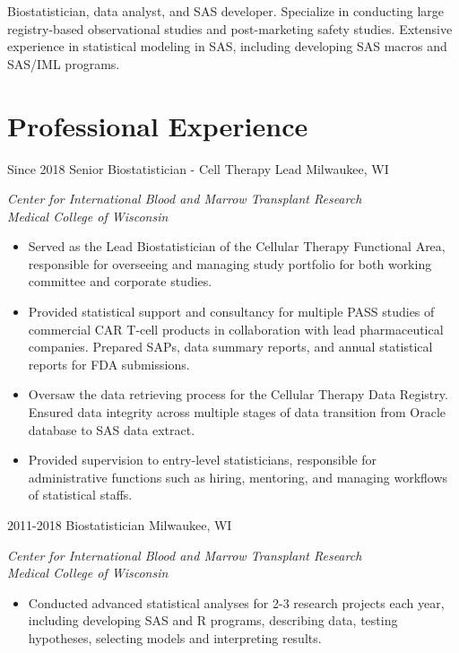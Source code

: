Biostatistician, data analyst, and SAS developer. Specialize in conducting large registry-based observational studies and post-marketing safety studies. Extensive experience in statistical modeling in SAS, including developing SAS macros and SAS/IML programs.\\

\section{Professional Experience}

\begin{entrylist}
  \entry
    {Since 2018}
    {Senior Biostatistician - Cell Therapy Lead}
    {Milwaukee, WI}
    {
      \textit{Center for International Blood and Marrow Transplant Research \\ Medical College of Wisconsin}
      \begin{itemize}
        \item Served as the Lead Biostatistician of the Cellular Therapy Functional Area, responsible for overseeing and managing study portfolio for both working committee and corporate studies.
        \item Provided statistical support and consultancy for multiple PASS studies of commercial CAR T-cell products in collaboration with lead pharmaceutical companies. Prepared SAPs, data summary reports, and annual statistical reports for FDA submissions.
        \item Oversaw the data retrieving process for the Cellular Therapy Data Registry. Ensured data integrity across multiple stages of data transition from Oracle database to SAS data extract.
        \item Provided supervision to entry-level statisticians, responsible for administrative functions such as hiring, mentoring, and managing workflows of statistical staffs.
      \end{itemize}
    }
  \entry
    {2011-2018}
    {Biostatistician}
    {Milwaukee, WI}
    {
      \textit{Center for International Blood and Marrow Transplant Research \\ Medical College of Wisconsin}
      \begin{itemize}
        \item Conducted advanced statistical analyses for 2-3 research projects each year, including developing SAS and R programs, describing data, testing hypotheses, selecting models and interpreting results.

\end{itemize}}
\end{entrylist}
